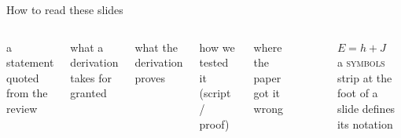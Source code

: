 \begin{frame}{How to read these slides}
  \begin{columns}[T]
    \begin{paperclaim}
      a statement quoted from the review
    \end{paperclaim}
    \begin{assume}
      what a derivation takes for granted
    \end{assume}
    \begin{keyresult}
      what the derivation proves
    \end{keyresult}
    \begin{checked}
      how we tested it (script / proof)
    \end{checked}
    \begin{erratum}
      where the paper got it wrong
    \end{erratum}
    \vskip0.2cm
    \centering
    \okpill\ \badpill\ \warnpill\ \partpill
    \vskip0.2cm
    \raggedright\small $E=h+J$ \quad {}\\[2pt]
    \small a \textcolor{noirgold}{\noirgaramond\scshape symbols} strip at the foot of a slide defines its notation
  \end{columns}
  \vskip0.25cm
\end{frame}
